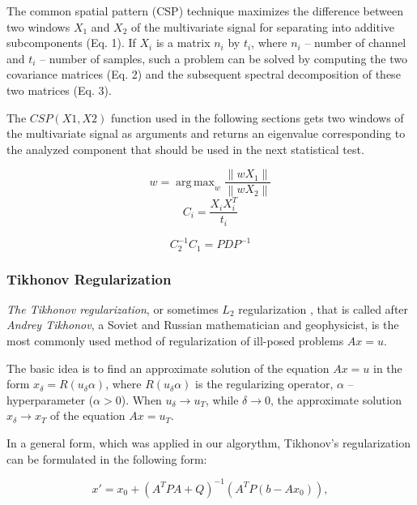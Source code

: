 \documentclass[14pt,a4paper]{scrartcl}
\DeclareMathOperator*{\argmax}{arg\,max}
\begin{document}
The common spatial pattern (CSP) technique maximizes the difference between two windows $X_{1}$ and $X_{2}$ of the multivariate signal for separating into additive subcomponents (Eq. 1). If $X_{i}$ is a matrix $n_{i}$ by $t_{i}$, where $n_{i}$ – number of channel and $t_{i}$ – number of samples, such a problem can be solved by computing the two covariance matrices (Eq. 2) and the subsequent spectral decomposition of these two matrices (Eq. 3).

The $CSP(X1, X2)$ function used in the following sections gets two windows of the multivariate signal as arguments and returns an eigenvalue corresponding to the analyzed component that should be used in the next statistical test.

\begin{equation}
w = \argmax_{w}{\frac{\left \| wX_{1} \right \|}{\left \| wX_{2} \right \|}}
\end{equation}
\begin{equation}
C_{i} = \frac{X_{i}X^{T}_{i}}{t_{i}}
\end{equation}

\begin{equation}
C^{-1}_{2}C_{1} = PDP^{-1}
\end{equation}


\subsubsection{Tikhonov Regularization}
\label{sec:Methods:Data Analysis:Tikhonov Regularization}

\textit{The Tikhonov regularization}, or sometimes $L_2$ regularization \cite{Ng2004}, that is called after \textit{Andrey Tikhonov}, a Soviet and Russian mathematician and geophysicist, is the most commonly used method of regularization of ill-posed problems $Ax = u$. 

The basic idea is to find an approximate solution of the equation $Ax = u$ in the form $x_{\delta} = R(u_{\delta}\alpha)$, where $R(u_{\delta}\alpha)$ is the regularizing operator, $\alpha$ – hyperparameter ($\alpha > 0$). When $u_{\delta} \rightarrow u_{T}$, while $\delta \rightarrow 0$, the approximate solution $x_{\delta} \rightarrow x_{T}$ of the equation $Ax = u_{T}$.

In a general form, which was applied in our algorythm, Tikhonov's regularization can be formulated in the following form: 

\begin{equation}
x' = x_0 + (A^{T}PA + Q)^{-1}(A^{T}P(b-Ax_{0})),
\end{equation}
\end{document}
